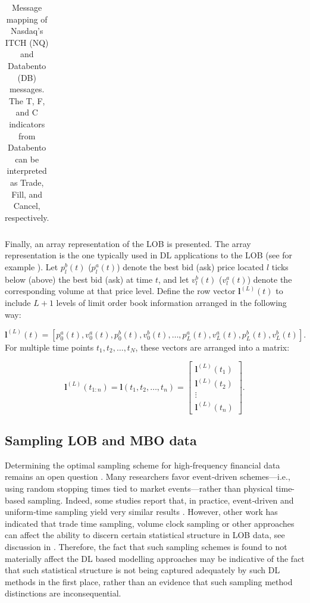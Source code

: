 \documentclass[10pt,a4paper,oneside]{article}
\begin{document}
\begin{table}[h!]
\begin{tabular}{|l|l|l|l|}
    \end{tabular}
    \caption{Message mapping of Nasdaq's ITCH (NQ) and Databento (DB) messages. The T, F, and C indicators from Databento can be interpreted as Trade, Fill, and Cancel, respectively.}
    \label{tab:db_itch_mapping}
\end{table}


Finally, an array representation of the LOB is presented. The array representation is the one typically used in DL applications to the LOB (see for example \cite{kolm2024improving, Zhang_2019}). Let $p_l^b(t)$ ($p_l^a(t)$) denote the best bid (ask) price located $l$ ticks below (above) the best bid (ask) at time $t$, and let $v_l^b(t)$ ($v_l^a(t)$) denote the corresponding volume at that price level. Define the row vector $\mathbf{l}^{(L)}(t)$ to include $L + 1$ levels of limit order book information arranged in the following way:

$$
    \mathbf{l}^{(L)}(t) = [p^a_0(t), v^a_0(t), p^b_0(t), v^b_0(t), \dots, p^a_L(t), v^a_L(t), p^b_L(t), v^b_L(t)].
$$
For multiple time points $t_1, t_2, \dots, t_N$, these vectors are arranged into a matrix:

$$
    \mathbf{l}^{(L)}(t_{1:n})=\mathbf{l}(t_1, t_2, \dots, t_n) = \begin{bmatrix}
        \mathbf{l}^{(L)}(t_1) \\
        \mathbf{l}^{(L)}(t_2) \\
        \vdots                \\
        \mathbf{l}^{(L)}(t_n)
    \end{bmatrix}.
$$

\subsection{Sampling LOB and MBO data}
\label{SubSect:SampLOB}
Determining the optimal sampling scheme for high-frequency financial data remains an open question \cite{dutta2023review}.  Many researchers favor event‐driven schemes—i.e., using random stopping times tied to market events—rather than physical time-based sampling.  Indeed, some studies report that, in practice, event‐driven and uniform‐time sampling yield very similar results \cite{easley2021microstructure}. However, other work has indicated that trade time sampling, volume clock sampling or other approaches can affect the ability to discern certain statistical structure in LOB data, see discussion in \cite{koukorinis4959155memory}. Therefore, the fact that such sampling schemes is found to not materially affect the DL based modelling approaches may be indicative of the fact that such statistical structure is not being captured adequately by such DL methods in the first place, rather than an evidence that such sampling method distinctions are inconsequential.
\end{document}

